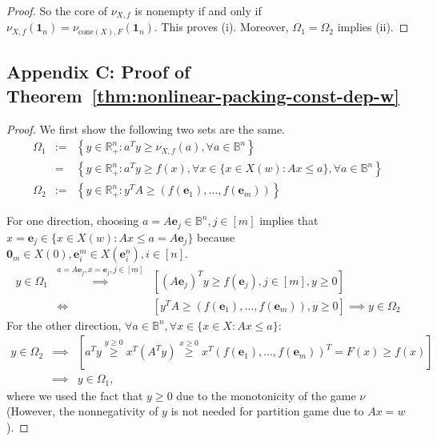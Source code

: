 \documentclass[11pt]{article}\usepackage[]{graphicx}\usepackage[]{xcolor}
\begin{document}
\begin{proof}
So the core of $\nu_{X, f}$ is nonempty if and only if $\nu_{X, f}\left(\mathbf{1}_n\right)=\nu_{\text{cone}(X), F}\left(\mathbf{1}_n\right)$. This proves (i).  Moreover, $\Omega_1=\Omega_2$ implies (ii). 

\end{proof}



\subsection{Appendix C: Proof of Theorem~\ref{thm:nonlinear-packing-const-dep-w}}

\begin{proof} 
We first show the following two sets are the same. 
\begin{eqnarray*}
\Omega_1&:=&\left\{y\in\mathbb{R}^n_{+}: a^Ty\ge \nu_{X, f}(a), \forall a\in\mathbb{B}^n\right\}\\
&=&\left\{y\in\mathbb{R}^n_{+}: a^Ty\ge f(x), \forall x\in \{x\in X(w): Ax\le a\}, \forall a\in \mathbb{B}^n\right\}\\
\Omega_2&:=&\left\{y\in\mathbb{R}^n_{+}: y^TA\ge (f(\mathbf{e}_1),\dots, f(\mathbf{e}_m))\right\}
\end{eqnarray*}

For one direction, choosing $a=A\mathbf{e}_j\in \mathbb{B}^n, j\in [m]$ implies that $x=\mathbf{e}_j\in \{x\in X(w): Ax\le a=A\mathbf{e}_j\}$ because $\mathbf{0}_m\in X(0), \mathbf{e}^m_i\in X(\mathbf{e}^n_i), i\in [n]$.
\begin{eqnarray*}
y\in \Omega_1&\overset{a=A\mathbf{e}_j, x=\mathbf{e}_j, j\in [m]}{\implies}& \left[ (A\mathbf{e}_j)^Ty\ge f(\mathbf{e}_j), j\in [m], y\ge 0 \right]\\
&\iff& \left[y^TA\ge (f(\mathbf{e}_1),\dots, f(\mathbf{e}_m)), y\ge 0\right] \implies y\in \Omega_2
\end{eqnarray*}
For the other direction, $\forall a\in \mathbb{B}^n, \forall x\in \{x\in X: Ax\le a\}$:
\begin{eqnarray*}
y\in \Omega_2&\implies& \left[a^Ty\overset{y\ge 0}{\ge} x^T(A^Ty)\overset{x\ge 0}{\ge} x^T(f(\mathbf{e}_1),\dots, f(\mathbf{e}_m))^T=F(x) \ge f(x)\right]\\
&\implies& y\in \Omega_1,
\end{eqnarray*}
where we used the fact that $y\ge 0$ due to the monotonicity of the game $\nu$ (However, the nonnegativity of $y$ is not needed for partition game due to $Ax=w$). 


\end{proof}
\end{document}
